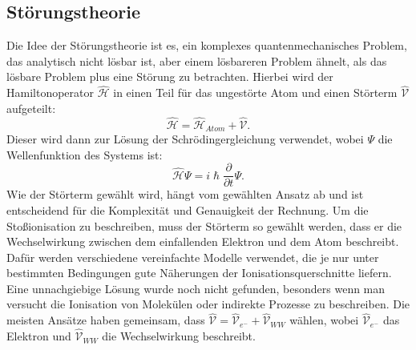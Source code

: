 \subsection{Störungstheorie}
Die Idee der Störungstheorie ist es, ein komplexes quantenmechanisches Problem, das analytisch nicht lösbar ist, aber einem lösbareren Problem ähnelt, als das lösbare Problem plus eine Störung zu betrachten. Hierbei wird der Hamiltonoperator $\hat{\mathcal{H}}$ in einen Teil für das ungestörte Atom und einen Störterm $\hat{\mathcal{V}}$ aufgeteilt:
\begin{equation}
    \hat{\mathcal{H}} = \hat{\mathcal{H}}_{Atom} + \hat{\mathcal{V}}.
\end{equation}
Dieser wird dann zur Lösung der Schrödingergleichung verwendet, wobei $\Psi$ die Wellenfunktion des Systems ist:
\begin{equation}
    \hat{\mathcal{H}} \Psi = i\hslash\frac{\partial}{\partial t}\Psi.
\end{equation}
Wie der Störterm gewählt wird, hängt vom gewählten Ansatz ab und ist entscheidend für die Komplexität und Genauigkeit der Rechnung. Um die Stoßionisation zu beschreiben, muss der Störterm so gewählt werden, dass er die Wechselwirkung zwischen dem einfallenden Elektron und dem Atom beschreibt. Dafür werden verschiedene vereinfachte Modelle verwendet, die je nur unter bestimmten Bedingungen gute Näherungen der Ionisationsquerschnitte liefern. Eine unnachgiebige Lösung wurde noch nicht gefunden, besonders wenn man versucht die Ionisation von Molekülen oder indirekte Prozesse zu beschreiben. Die meisten Ansätze haben gemeinsam, dass $\hat{\mathcal{V}} = \hat{\mathcal{V}}_{e^-} + \hat{\mathcal{V}}_{WW}$ wählen, wobei $\hat{\mathcal{V}}_{e^-}$ das Elektron und $\hat{\mathcal{V}}_{WW}$ die Wechselwirkung  beschreibt. 

